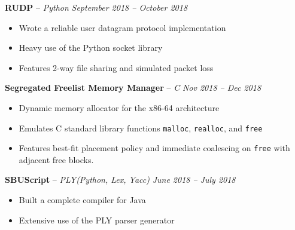 \documentclass[10pt,letterpaper]{article}
\begin{document}

\headedsection
{\textbf{RUDP} -- \textit{Python}}
{\textit{September 2018 -- October 2018}} {
	\begin{itemize}[noitemsep,nolistsep]
		\item Wrote a reliable user datagram protocol implementation
		\item Heavy use of the Python socket library
		\item Features 2-way file sharing and simulated packet loss
	\end{itemize}
}


\headedsection
{\textbf{Segregated Freelist Memory Manager} -- \textit{C}}
{\textit{Nov 2018 -- Dec 2018}} {
	\begin{itemize}[noitemsep,nolistsep]
		\item Dynamic memory allocator for the x86-64 architecture
		\item Emulates C standard library functions \texttt{malloc}, \texttt{realloc}, and \texttt{free}
		\item Features best-fit placement policy and immediate coalescing on \texttt{free} with adjacent free blocks.
	\end{itemize}
}


\headedsection
{\textbf{SBUScript} -- \textit{PLY(Python, Lex, Yacc)}}
{\textit{June 2018 -- July 2018}} {
	\begin{itemize}[noitemsep,nolistsep]
		\item Built a complete compiler for Java
		\item Extensive use of the PLY parser generator
	\end{itemize}
}

\spacedhrule{0.3em}{-0.6em}
\end{document}
